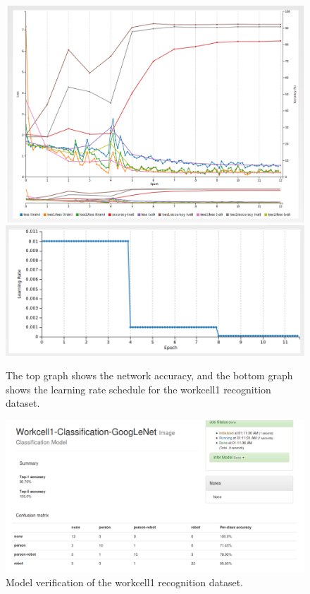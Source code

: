 \documentclass[10pt,journal,compsoc]{IEEEtran}
\begin{document}
\begin{figure}[thpb]
  \centering
  \includegraphics[width=\linewidth]{../img/Workcell1-Classification/initial/WC1-1-Loss-Accuracy.png} \\
  \includegraphics[width=\linewidth]{../img/Workcell1-Classification/initial/WC1-1-learning-rate.png}
  \caption{The top graph shows the network accuracy, and the bottom graph shows the learning rate schedule for the workcell1 recognition dataset.}
  \label{WC1-acc-loss}
\end{figure}

\begin{figure}[thpb]
  \centering
  \includegraphics[width=\linewidth]{../img/Workcell1-Classification/initial/WC1-1-classification-test.png}
  \caption{Model verification of the workcell1 recognition dataset.}
  \label{WC1-verification}
\end{figure}
\end{document}
